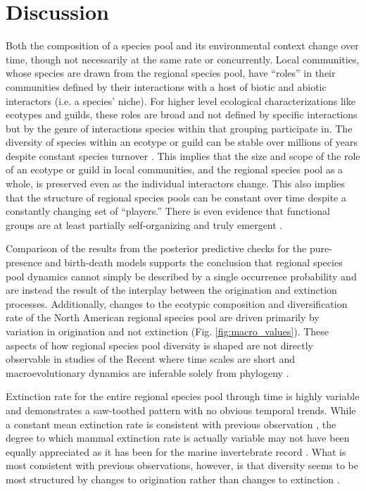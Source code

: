 \documentclass[12pt,letterpaper]{article}
\begin{document}
\section*{Discussion}

Both the composition of a species pool and its environmental context change over time, though not necessarily at the same rate or concurrently. Local communities, whose species are drawn from the regional species pool, have ``roles'' in their communities defined by their interactions with a host of biotic and abiotic interactors (i.e. a species' niche). For higher level ecological characterizations like ecotypes and guilds, these roles are broad and not defined by specific interactions but by the genre of interactions species within that grouping participate in. The diversity of species within an ecotype or guild can be stable over millions of years despite constant species turnover \citep{Jernvall2004,Slater2015c,Valkenburgh1999}. This implies that the size and scope of the role of an ecotype or guild in local communities, and the regional species pool as a whole, is preserved even as the individual interactors change. This also implies that the structure of regional species pools can be constant over time despite a constantly changing set of ``players.'' There is even evidence that functional groups are at least partially self-organizing and truly emergent \citep{Scheffer2006a}.

Comparison of the results from the posterior predictive checks for the pure-presence and birth-death models supports the conclusion that regional species pool dynamics cannot simply be described by a single occurrence probability and are instead the result of the interplay between the origination and extinction processes. Additionally, changes to the ecotypic composition and diversification rate of the North American regional species pool are driven primarily by variation in origination and not extinction (Fig. \ref{fig:macro_values}). These aspects of how regional species pool diversity is shaped are not directly observable in studies of the Recent where time scales are short and macroevolutionary dynamics are inferable solely from phylogeny \citep{Fritz2013a,Price2016b}.

Extinction rate for the entire regional species pool through time is highly variable and demonstrates a saw-toothed pattern with no obvious temporal trends. While a constant mean extinction rate is consistent with previous observation \citep{Alroy1996a,Alroy2000g}, the degree to which mammal extinction rate is actually variable may not have been equally appreciated as it has been for the marine invertebrate record \citep{Foote2000,Foote2000a,Foote2006,Foote2010}. What is most consistent with previous observations, however, is that diversity seems to be most structured by changes to origination rather than changes to extinction \citep{Alroy1996a,Alroy2000g}.
\end{document}
